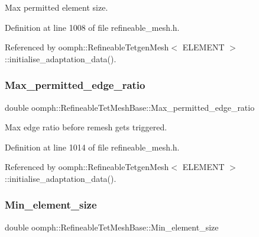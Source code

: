 Max permitted element size. 



Definition at line 1008 of file refineable\+\_\+mesh.\+h.



Referenced by oomph\+::\+Refineable\+Tetgen\+Mesh$<$ E\+L\+E\+M\+E\+N\+T $>$\+::initialise\+\_\+adaptation\+\_\+data().

\mbox{\label{classoomph_1_1RefineableTetMeshBase_ae37561a28948852409a84dd5e8fe068e}} 
\subsubsection{\texorpdfstring{Max\+\_\+permitted\+\_\+edge\+\_\+ratio}{Max\_permitted\_edge\_ratio}}
{\footnotesize\ttfamily double oomph\+::\+Refineable\+Tet\+Mesh\+Base\+::\+Max\+\_\+permitted\+\_\+edge\+\_\+ratio}



Max edge ratio before remesh gets triggered. 



Definition at line 1014 of file refineable\+\_\+mesh.\+h.



Referenced by oomph\+::\+Refineable\+Tetgen\+Mesh$<$ E\+L\+E\+M\+E\+N\+T $>$\+::initialise\+\_\+adaptation\+\_\+data().

\mbox{\label{classoomph_1_1RefineableTetMeshBase_ad218437fae016c99b5b7a26e82f69a03}} 
\subsubsection{\texorpdfstring{Min\+\_\+element\+\_\+size}{Min\_element\_size}}
{\footnotesize\ttfamily double oomph\+::\+Refineable\+Tet\+Mesh\+Base\+::\+Min\+\_\+element\+\_\+size}



